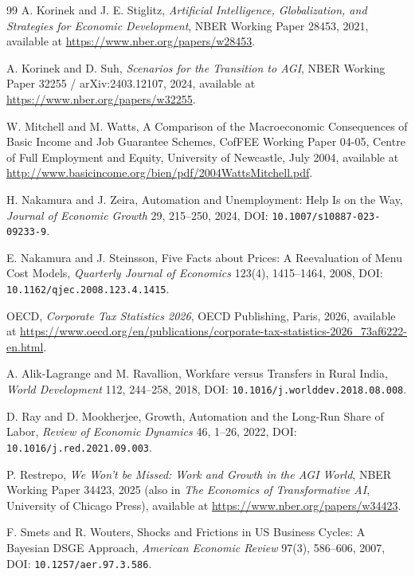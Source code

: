 \documentclass[review,12pt]{elsarticle}
\theoremstyle{plain}
\theoremstyle{definition}
\theoremstyle{remark}
\begin{document}
\begin{thebibliography}{99}
 A. Korinek and J. E. Stiglitz, \emph{Artificial Intelligence, Globalization, and Strategies for Economic Development}, NBER Working Paper 28453, 2021, available at \url{https://www.nber.org/papers/w28453}.

 A. Korinek and D. Suh, \emph{Scenarios for the Transition to AGI}, NBER Working Paper 32255 / arXiv:2403.12107, 2024, available at \url{https://www.nber.org/papers/w32255}.

 W. Mitchell and M. Watts, A Comparison of the Macroeconomic Consequences of Basic Income and Job Guarantee Schemes, CofFEE Working Paper 04-05, Centre of Full Employment and Equity, University of Newcastle, July 2004, available at \url{http://www.basicincome.org/bien/pdf/2004WattsMitchell.pdf}.

 H. Nakamura and J. Zeira, Automation and Unemployment: Help Is on the Way, \emph{Journal of Economic Growth} 29, 215--250, 2024, DOI: \texttt{10.1007/s10887-023-09233-9}.

 E. Nakamura and J. Steinsson, Five Facts about Prices: A Reevaluation of Menu Cost Models, \emph{Quarterly Journal of Economics} 123(4), 1415--1464, 2008, DOI: \texttt{10.1162/qjec.2008.123.4.1415}.

 OECD, \emph{Corporate Tax Statistics 2026}, OECD Publishing, Paris, 2026, available at \url{https://www.oecd.org/en/publications/corporate-tax-statistics-2026\_73af6222-en.html}.

 A. Alik-Lagrange and M. Ravallion, Workfare versus Transfers in Rural India, \emph{World Development} 112, 244--258, 2018, DOI: \texttt{10.1016/j.worlddev.2018.08.008}.

 D. Ray and D. Mookherjee, Growth, Automation and the Long-Run Share of Labor, \emph{Review of Economic Dynamics} 46, 1--26, 2022, DOI: \texttt{10.1016/j.red.2021.09.003}.

 P. Restrepo, \emph{We Won't be Missed: Work and Growth in the AGI World}, NBER Working Paper 34423, 2025 (also in \emph{The Economics of Transformative AI}, University of Chicago Press), available at \url{https://www.nber.org/papers/w34423}.

 F. Smets and R. Wouters, Shocks and Frictions in US Business Cycles: A Bayesian DSGE Approach, \emph{American Economic Review} 97(3), 586--606, 2007, DOI: \texttt{10.1257/aer.97.3.586}.


\end{thebibliography}
\end{document}
